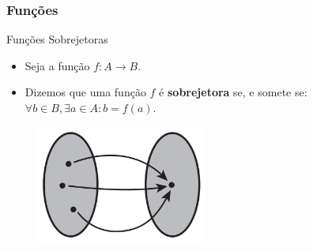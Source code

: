 \documentclass{beamer}
\begin{document}
\begin{frame}
\frametitle{Funções}

	\begin{block}{Funções Sobrejetoras}
		\begin{itemize}
			\item Seja a função $f: A \to B$.
			\item<1-> Dizemos que uma função $f$ é \textbf{sobrejetora} se, e somete se:\\ $ \forall b \in B,\exists a \in A : b = f(a)$.
		\end{itemize}
	\end{block}
	
	\begin{figure}[!h]
			\begin{center}
			\includegraphics[width=0.5\textwidth]{Figures/sobrejetora}
			\end{center}
	\end{figure}	
	
\end{frame}

\end{document}
